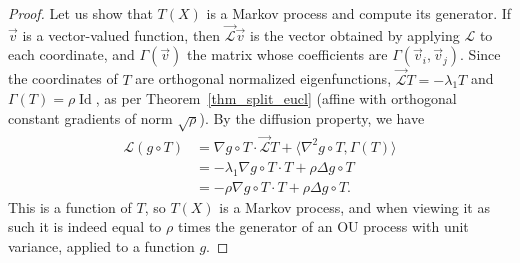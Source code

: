 \documentclass[10pt,a4paper]{amsart}
\begin{document}
\begin{proof}
  Let us show that $T(X)$ is a Markov process and compute its
  generator. %
  If $\vec{v}$ is a vector-valued function, then $\vec{\mathcal{L}} \vec{v} $
  is the vector obtained by applying $\mathcal{L}$ to each coordinate, and
  $\Gamma(\vec{v})$ the matrix whose coefficients are
  $\Gamma(\vec{v}_i, \vec{v}_j)$. Since the coordinates of $T$ are orthogonal
  normalized eigenfunctions, $\vec{\mathcal{L}} T = - \lambda_1 T$ and
  $\Gamma(T) = \rho \operatorname{Id}$, as per Theorem~\ref{thm_split_eucl}
  (affine with orthogonal constant gradients of norm $\sqrt{\rho}$). By the
  diffusion property, we have
  \begin{align}
    \mathcal{L}(g \circ T) &= \nabla g \circ T \cdot \vec{\mathcal{L}} T + \langle \nabla^2 g \circ T, \Gamma(T)\rangle \\
                  &= - \lambda_1 \nabla g\circ T \cdot T + \rho \Delta g \circ T \\
                  &= - \rho \nabla g\circ T \cdot T + \rho \Delta g \circ T.
  \end{align}
  This is a function of $T$, so $T(X)$ is a Markov process, and when viewing
  it as such it is indeed equal to $\rho$ times the generator of an OU process
  with unit variance, applied to a function $g$.
\end{proof}
\end{document}
